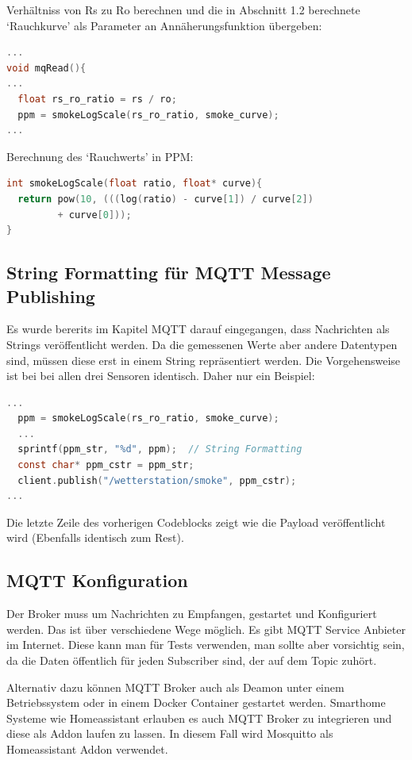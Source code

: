 \documentclass[a4paper, 11pt]{article}
\begin{document}
Verhältniss von Rs zu Ro berechnen und die in Abschnitt 1.2 berechnete
`Rauchkurve' als Parameter an Annäherungsfunktion übergeben:

\begin{lstlisting}[language=C, style=code]
...
void mqRead(){
...
  float rs_ro_ratio = rs / ro;
  ppm = smokeLogScale(rs_ro_ratio, smoke_curve);
...
\end{lstlisting}

Berechnung des `Rauchwerts' in PPM:

\begin{lstlisting}[language=C, style=code]
int smokeLogScale(float ratio, float* curve){
  return pow(10, (((log(ratio) - curve[1]) / curve[2])
         + curve[0]));
}
\end{lstlisting}

\subsection{String Formatting für MQTT Message Publishing}
Es wurde bererits im Kapitel MQTT darauf eingegangen, dass Nachrichten als Strings
veröffentlicht werden. Da die gemessenen Werte aber andere Datentypen sind,
müssen diese erst in einem String repräsentiert werden. Die Vorgehensweise
ist bei bei allen drei Sensoren identisch. Daher nur ein Beispiel:

\begin{lstlisting}[language=C, style=code]
...
  ppm = smokeLogScale(rs_ro_ratio, smoke_curve);
  ...          
  sprintf(ppm_str, "%d", ppm);  // String Formatting                     
  const char* ppm_cstr = ppm_str;
  client.publish("/wetterstation/smoke", ppm_cstr);
...
\end{lstlisting}

Die letzte Zeile des vorherigen Codeblocks zeigt wie die Payload veröffentlicht
wird (Ebenfalls identisch zum Rest).

\subsection{MQTT Konfiguration}
Der Broker muss um Nachrichten zu Empfangen, gestartet und Konfiguriert werden.
Das ist über verschiedene Wege möglich. Es gibt MQTT Service Anbieter im
Internet. Diese kann man für Tests verwenden, man sollte aber vorsichtig sein,
da die Daten öffentlich für jeden Subscriber sind, der auf dem Topic zuhört.

\newpage
Alternativ dazu können MQTT Broker auch als Deamon unter einem Betriebssystem
oder in einem Docker Container gestartet werden. Smarthome Systeme wie Homeassistant
erlauben es auch MQTT Broker zu integrieren und diese als Addon laufen zu lassen.
In diesem Fall wird Mosquitto als Homeassistant Addon verwendet.
\end{document}
